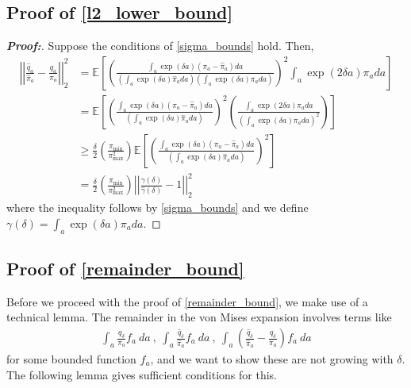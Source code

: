 \documentclass[11pt,twoside]{article}
\theoremstyle{definition}
\theoremstyle{remark}
\begin{document}
\subsection{Proof of \texorpdfstring{\cref{l2_lower_bound}}{Equation (3)}} \label{l2_lower_bound_proof}
\begin{proof}[\textbf{Proof:}] Suppose the conditions of \cref{sigma_bounds} hold. Then,
\begin{align*}
    \left|\left| \frac{\widehat{q}_a}{\widehat{\pi}_a} - \frac{q_a}{\pi_a} \right|\right|^2_2 &= \mathbb{E}\left[\left( \frac{\int_a \exp(\delta a) (\pi_a - \widehat{\pi}_a) da }{\left(\int_a \exp(\delta a) \widehat{\pi}_a da \right)\left(\int_a \exp(\delta a) \pi_a da \right)}\right)^2 \int_a \exp(2 \delta a)\pi_a da \right] \\
    &= \mathbb{E}\left[\left( \frac{\int_a \exp(\delta a) (\pi_a - \widehat{\pi}_a) da }{\left(\int_a \exp(\delta a) \widehat{\pi}_a da \right)}\right)^2 \left(\frac{\int_a \exp(2 \delta a)\pi_a da}{\left(\int_a \exp(\delta a) \pi_a da \right)^2 } \right)\right] \\
    &\geq \frac{\delta}{2} \left( \frac{\pi_{\min}}{\pi^2_{\max}}\right)\mathbb{E}\left[\left( \frac{\int_a \exp(\delta a) (\pi_a - \widehat{\pi}_a) da }{\left(\int_a \exp(\delta a) \widehat{\pi}_a da \right)}\right)^2\right] \\
    &= \frac{\delta}{2} \left( \frac{\pi_{\min}}{\pi^2_{\max}}\right) \left| \left| \frac{\gamma(\delta) }{\widehat{\gamma}(\delta)} - 1 \right| \right|^2_2
\end{align*}
where the inequality follows by \cref{sigma_bounds} and we define $\gamma(\delta) = \int_a \exp(\delta a)\pi_a da$.
\end{proof}


\subsection{Proof of \texorpdfstring{\cref{remainder_bound}}{Theorem 3}} \label{remainder_bound_proof}

Before we proceed with the proof of \cref{remainder_bound}, we make use of a technical lemma. The remainder in the von Mises expansion involves terms like 
\begin{align*}
    \int_a \frac{q_\delta}{\pi_a} f_a \ da \ , \ \int_a \frac{\widehat{q}_\delta}{\widehat\pi_a} f_a \ da \ , \ \int_a \left(  \frac{\widehat{q}_\delta}{\widehat\pi_a} - \frac{q_\delta}{\pi_a} \right) f_a \ da 
\end{align*}
for some bounded function $f_a$, and we want to show these are not growing with $\delta$. The following lemma gives sufficient conditions for this. 
\end{document}
